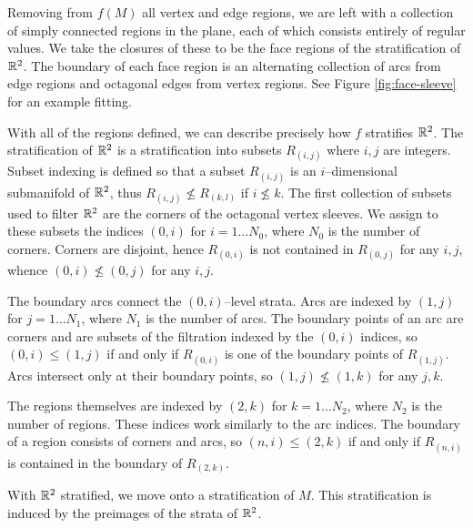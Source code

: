 Removing from $f(M)$ all vertex and edge regions, we are left with a collection of simply connected regions in the plane, each of which consists entirely of regular values.
We take the closures of these to be the face regions of the stratification of $\mathbb{R}^2$.
The boundary of each face region is an alternating collection of arcs from edge regions and octagonal edges from vertex regions.
See Figure \ref{fig:face-sleeve} for an example fitting.

With all of the regions defined, we can describe precisely how $f$ stratifies $\mathbb{R}^2$.
The stratification of $\mathbb{R}^2$ is a stratification into subsets $R_{(i,j)}$ where $i,j$ are integers.
Subset indexing is defined so that a subset $R_{(i,j)}$ is an $i$--dimensional submanifold of $\mathbb{R}^2$, thus $R_{(i,j)}\nleq R_{(k,l)}$ if $i\nleq k$.
The first collection of subsets used to filter $\mathbb{R}^2$ are the corners of the octagonal vertex sleeves.
We assign to these subsets the indices $(0,i)$ for $i=1\dots N_0$, where $N_0$ is the number of corners.
Corners are disjoint, hence $R_{(0,i)}$ is not contained in $R_{(0,j)}$ for any $i, j$, whence $(0,i)\nleq (0,j)$ for any $i,j$.

The boundary arcs connect the $(0,i)$--level strata.
Arcs are indexed by $(1,j)$ for $j=1\dots N_1$, where $N_1$ is the number of arcs.
The boundary points of an arc are corners and are subsets of the filtration indexed by the $(0,i)$ indices, so $(0,i)\leq (1,j)$ if and only if $R_{(0,i)}$ is one of the boundary points of $R_{(1,j)}$.
Arcs intersect only at their boundary points, so $(1,j)\nleq(1,k)$ for any $j,k$. 

The regions themselves are indexed by $(2,k)$ for $k=1\dots N_2$, where $N_2$ is the number of regions.
These indices work similarly to the arc indices.
The boundary of a region consists of corners and arcs, so $(n,i)\leq(2,k)$ if and only if $R_{(n,i)}$ is contained in the boundary of $R_{(2,k)}$.

With $\mathbb{R}^2$ stratified, we move onto a stratification of $M$.
This stratification is induced by the preimages of the strata of $\mathbb{R}^2$.

%
%
%
%

